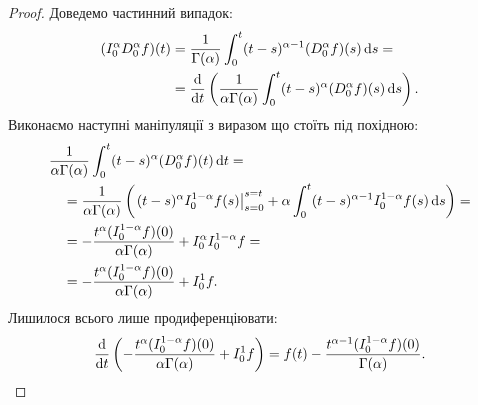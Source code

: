 \begin{proof}
    Доведемо частинний випадок:
    \begin{equation}
        \begin{aligned}
            (I_0^{\alpha} D_0^{\alpha} f)(t) 
            &= \frac{1}{\Gamma(\alpha)} \int_0^t (t - s)^{\alpha - 1} (D_0^{\alpha} f) (s) \mathop{}\!\mathrm{d} s = \\
            &= \frac{\mathop{}\!\mathrm{d}}{\mathop{}\!\mathrm{d} t} \left( \frac{1}{\alpha \Gamma(\alpha)} \int_0^t (t - s)^{\alpha} (D_0^{\alpha} f) (s) \mathop{}\!\mathrm{d} s \right).
        \end{aligned}
    \end{equation}
    Виконаємо наступні маніпуляції з виразом що стоїть під похідною:
    \begin{equation}
        \begin{aligned}
            & \frac{1}{\alpha \Gamma(\alpha)} \int_0^t (t - s)^{\alpha} (D_0^{\alpha} f) (t) \mathop{}\!\mathrm{d} t = \\
            &\quad = \frac{1}{\alpha \Gamma(\alpha)} \left( \left. (t - s)^{\alpha} I_0^{1-\alpha} f (s) \right|_{s = 0}^{s = t} + \alpha \int_0^t (t - s)^{\alpha - 1} I_0^{1-\alpha} f(s) \mathop{}\!\mathrm{d} s \right) = \\
            &\quad = - \frac{t^\alpha (I_0^{1 - \alpha} f)(0)}{\alpha \Gamma(\alpha)} + I_0^{\alpha} I_0^{1 - \alpha} f = \\
            &\quad = - \frac{t^\alpha (I_0^{1 - \alpha} f)(0)}{\alpha \Gamma(\alpha)} + I_0^{1} f.
        \end{aligned}
    \end{equation}
    Лишилося всього лише продиференціювати:
    \begin{equation}
        \frac{\mathop{}\!\mathrm{d}}{\mathop{}\!\mathrm{d} t} \left( -\frac{t^\alpha (I_0^{1 - \alpha} f)(0)}{\alpha \Gamma(\alpha)} + I_0^{1} f \right) = f(t) - \frac{t^{\alpha - 1} (I_0^{1 - \alpha} f)(0)}{\Gamma(\alpha)}.
    \end{equation}
\end{proof}

